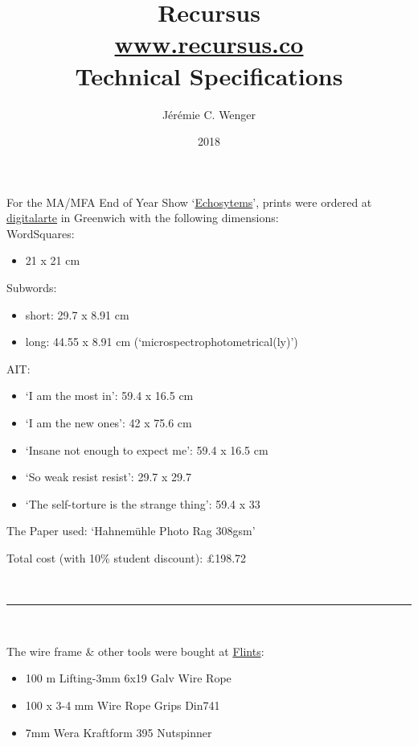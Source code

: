 \documentclass[9pt, twocolumn]{memoir}
\title{{\Huge Recursus}  \\ {\large \href{http://recursus.co/}{www.recursus.co}} \\ {\large Technical Specifications}}
\date{{\normalsize 2018}}
\author{Jérémie C. Wenger}
\providecommand{\tightlist}{%
  \setlength{\itemsep}{0pt}\setlength{\parskip}{0pt}}
\begin{document}
\maketitle
\thispagestyle{empty}

For the MA/MFA End of Year Show
`\href{http://echosystems.xyz/}{Echosytems}', prints were ordered at
\href{https://www.digitalarte.co.uk/}{digitalarte} in Greenwich with the
following dimensions: 
\\

WordSquares:

\begin{itemize}
\tightlist
\item
  21 x 21 cm
\end{itemize}

Subwords:

\begin{itemize}
\tightlist
\item
  short: 29.7 x 8.91 cm
\item
  long: 44.55 x 8.91 cm (`microspectrophotometrical(ly)')
\end{itemize}

AIT:

\begin{itemize}
\tightlist
\item
  `I am the most in': 59.4 x 16.5 cm
\item
  `I am the new ones': 42 x 75.6 cm
\item
  `Insane not enough to expect me': 59.4 x 16.5 cm
\item
  `So weak resist resist': 29.7 x 29.7
\item
  `The self-torture is the strange thing': 59.4 x 33
\end{itemize}


The Paper used: `Hahnemühle Photo Rag 308gsm'


Total cost (with 10\% student discount): £198.72

~

\fancybreak{§}

~

The wire frame \& other tools were bought at \href{http://www.flints.co.uk/content/}{Flints}:

\begin{itemize}
\tightlist
\item
  100 m Lifting-3mm 6x19 Galv Wire Rope
\item
  100 x 3-4 mm Wire Rope Grips Din741
\item
  7mm Wera Kraftform 395 Nutspinner 
\end{itemize}
\end{document}
